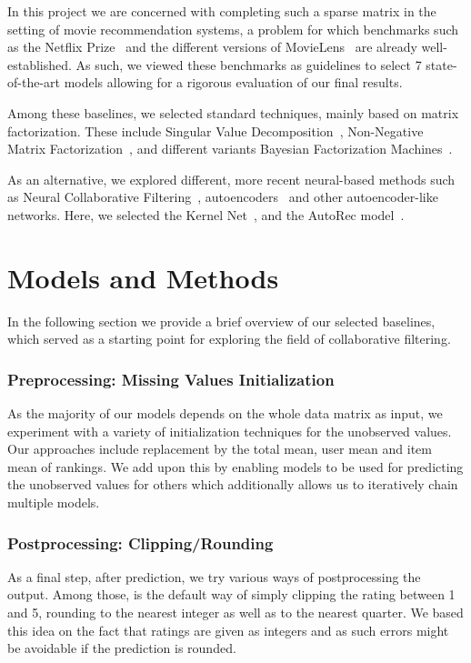 \documentclass[10pt,conference,compsocconf]{IEEEtran}
\begin{document}
    In this project we are concerned with completing such a sparse matrix in the setting of movie recommendation systems, a problem for which benchmarks such as the Netflix Prize~\cite{Netflix} and the different versions of MovieLens~\cite{Movielens} are already well-established.
    As such, we viewed these benchmarks as guidelines to select 7 state-of-the-art models allowing for a rigorous evaluation of our final results.

    Among these baselines, we selected standard techniques, mainly based on matrix factorization.
    These include Singular Value Decomposition~\cite{svd}, Non-Negative Matrix Factorization~\cite{6165290}, and different variants Bayesian Factorization Machines~\cite{freudenthaler_bayesian_2011, salakhutdinov_bayesian_2008}.

    As an alternative, we explored different, more recent neural-based methods such as Neural Collaborative Filtering~\cite{DBLP:journals/corr/abs-1708-05031}, autoencoders~\cite{inproceedings} and other autoencoder-like networks.
    Here, we selected the Kernel Net~\cite{pmlr-v80-muller18a}, and the AutoRec model~\cite{inproceedings}.


    \section{Models and Methods}
    In the following section we provide a brief overview of our selected baselines, which served as a starting point for exploring the field of collaborative filtering.

    \subsubsection{Preprocessing: Missing Values Initialization}\label{subsub:missing_init}
    As the majority of our models depends on the whole data matrix as input, we experiment with a variety of initialization techniques for the unobserved values.
    Our approaches include replacement by the total mean, user mean and item mean of rankings.
    We add upon this by enabling models to be used for predicting the unobserved values for others which additionally allows us to iteratively chain multiple models.

    \subsubsection{Postprocessing: Clipping/Rounding}
    As a final step, after prediction, we try various ways of postprocessing the output.
    Among those, is the default way of simply clipping the rating between 1 and 5, rounding to the nearest integer as well as to the nearest quarter.
    We based this idea on the fact that ratings are given as integers and as such errors might be avoidable if the prediction is rounded.
\end{document}
